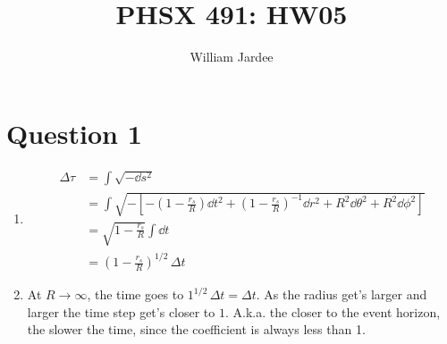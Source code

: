 \documentclass[11pt]{article}
\begin{document}
\title{PHSX 491: HW05}
\author{William Jardee}
\maketitle

\section*{Question 1}
\begin{enumerate}[label=\alph*)]
\item
\begin{align*}
\Delta \tau & = \int \sqrt{-\dd{s}^2} \\
& = \int \sqrt{-\left[-\left(1 - \frac{r_s}{R}\right)\dd{t}^2 + \left(1 - \frac{r_s}{R}\right)^{-1}\dd{r}^2 + R^2 \dd{\theta}^2 + R^2 \dd{\phi}^2\right]}\\
& = \sqrt{1 - \frac{r_s}{R}}\int \dd{t}\\
& = \left(1 - \frac{r_s}{R}\right)^{1/2} \, \Delta t
\end{align*}

\item At $R \rightarrow \infty$, the time goes to $1^{1/2} \, \Delta t = \Delta t$. As the radius get's larger and larger the time step get's closer to $1$. A.k.a. the closer to the event horizon, the slower the time, since the coefficient is always less than 1.


\end{enumerate}
\end{document}
